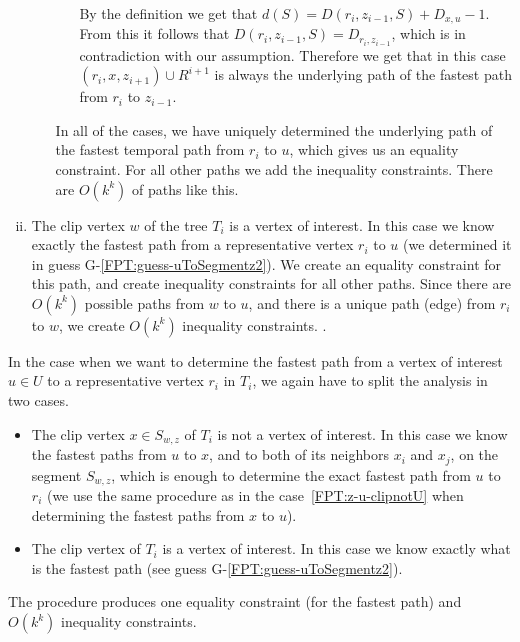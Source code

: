 \documentclass[a4paper,UKenglish,cleveref, autoref, thm-restate]{lipics-v2021}
\begin{document}
\begin{enumerate}[(i)]
\begin{enumerate}[(a)]
\begin{itemize}
            By the definition we get that $d(S) = D(r_i,z_{i-1},S) + D_{x,u} - 1$.
            From this it follows that $D(r_i,z_{i-1},S) = D_{r_i, z_{i-1}}$, which is in contradiction with our assumption.
            Therefore we get that in this case 
            $(r_i, x, z_{i+1}) \cup R^{i+1}$ is always the underlying path of the fastest path from $r_i$ to $z_{i-1}$.
        \end{itemize}
       In all of the cases, we have uniquely determined the underlying path of the fastest temporal path from $r_i$ to $u$,
       which gives us an equality constraint.
       For all other paths we add the inequality constraints. 
       There are $O(k^k)$ of paths like this.
    \end{enumerate}
    
    \item The clip vertex $w$ of the tree $T_i$ is a vertex of interest.
    In this case we know exactly the fastest path from a representative vertex $r_i$ to $u$
    (we determined it in guess G-\ref{FPT:guess-uToSegmentz2}).
    We create an equality constraint for this path,
    and create inequality constraints for all other paths.
    Since there are $O(k^k)$ possible paths from $w$ to $u$, and there is a unique path (edge) from $r_i$ to $w$,
    we create $O(k^k)$ inequality constraints. .
\end{enumerate}

In the case when we want to determine the fastest path from a vertex of interest $u \in U$ to a representative vertex $r_i$ in $T_i$, we 
again have to split the analysis in two cases.
\begin{itemize}
    \item The clip vertex $x \in S_{w,z}$ of $T_i$ is not a vertex of interest.
    In this case
we know the fastest paths from $u$ to $x$, and to both of its neighbors $x_{i}$ and $x_{j}$, on the segment $S_{w,z}$,
which is enough to determine the exact fastest path from $u$ to $r_i$ 
(we use the same procedure as in the case~\ref{FPT:z-u-clipnotU} when determining the fastest paths from $x$ to $u$).
\item The clip vertex of $T_i$ is a vertex of interest.
    In this case
we know exactly what is the fastest path (see guess G-\ref{FPT:guess-uToSegmentz2}).
\end{itemize}
The procedure produces one equality constraint (for the fastest path) and $O(k^k)$ inequality constraints.
\end{document}
